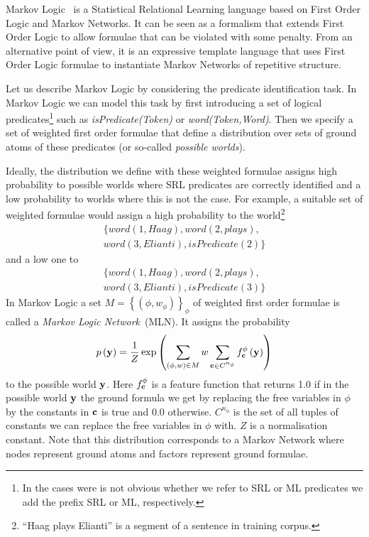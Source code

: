 

Markov Logic~\citep[ML,][]{richardson05markov} is a Statistical Relational Learning language based on First Order Logic and Markov Networks. It can be seen as a formalism that extends First Order Logic to allow formulae that can be violated
with some penalty. From an alternative point of view, it is an expressive
template language that uses First Order Logic formulae to instantiate
Markov Networks of repetitive structure. 

Let us describe Markov Logic by considering the predicate identification task. In Markov Logic we can model this task by first introducing a set of logical predicates\footnote{In the cases were is not obvious whether we refer to SRL or ML predicates we add the prefix SRL or ML, respectively.} such as \emph{isPredicate(Token)} or \emph{word(Token,Word)}. Then we specify a set of weighted first order formulae that define a distribution over sets of ground atoms of these predicates (or so-called \emph{possible worlds}). 

Ideally, the distribution we define with these weighted formulae assigns high probability to possible worlds where SRL predicates are correctly identified and a low probability to worlds where this is not the case. For example, a suitable set of weighted formulae would assign a high probability to the world\footnote{``Haag plays Elianti'' is a segment of a sentence in training corpus.}
\begin{eqnarray*}
 &\{ word\left(1,Haag\right),word(2,plays),\\
 & word(3,Elianti),isPredicate(2) \}& \end{eqnarray*}
and a low one to
\begin{eqnarray*}
& \{ word\left(1,Haag\right),word(2,plays),\\
 & word(3,Elianti),isPredicate(3) \} &\end{eqnarray*}
In Markov Logic a set $M=\left\{ \left(\phi,w_{\phi}\right)\right\} _{\phi}$ of weighted first order formulae is called a \emph{Markov Logic Network}~(MLN). It assigns the probability
\begin{equation}
p\left(\mathbf{y}\right)=\frac{1}{Z}\exp\left(
\sum_{\left(\phi,w\right)\in M} w
\sum_{\mathbf{c}\in C^{n_{\phi}}}f_{\mathbf{c}}^{\phi}\left(\mathbf{y}\right)
\right)
\label{eq:prob}
\end{equation}
to the possible world $\mathbf{y}$. Here $f_{\mathbf{c}}^{\phi}$ is a feature
function that returns 1.0 if in the possible world $\mathbf{y}$ the ground
formula we get by replacing the free variables in $\phi$ by the constants
in $\mathbf{c}$ is true and 0.0 otherwise. $C^{n_{\phi}}$ is the set
of all tuples of constants we can replace the free variables in $\phi$
with. $Z$ is a normalisation constant. Note that this distribution corresponds to a Markov Network where nodes represent ground atoms and factors represent ground formulae.

